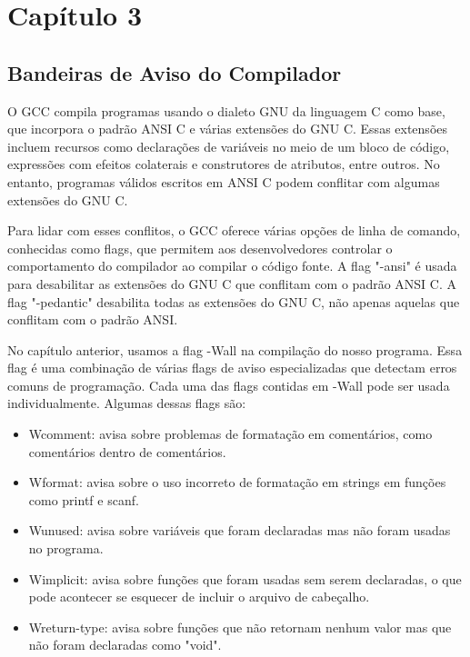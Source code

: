 \chapter{Capítulo 3}

\section{Bandeiras de Aviso do Compilador}

O GCC compila programas usando o dialeto GNU da linguagem C como base, que incorpora o padrão ANSI C e várias extensões do GNU C. Essas extensões incluem recursos como declarações de variáveis no meio de um bloco de código, expressões com efeitos colaterais e construtores de atributos, entre outros. No entanto, programas válidos escritos em ANSI C podem conflitar com algumas extensões do GNU C.

Para lidar com esses conflitos, o GCC oferece várias opções de linha de comando, conhecidas como flags, que permitem aos desenvolvedores controlar o comportamento do compilador ao compilar o código fonte. A flag "-ansi" é usada para desabilitar as extensões do GNU C que conflitam com o padrão ANSI C. A flag "-pedantic" desabilita todas as extensões do GNU C, não apenas aquelas que conflitam com o padrão ANSI.

No capítulo anterior, usamos a flag -Wall na compilação do nosso programa. Essa flag é uma combinação de várias flags de aviso especializadas que detectam erros comuns de programação. Cada uma das flags contidas em -Wall pode ser usada individualmente. Algumas dessas flags são:

\begin{itemize}
    \item Wcomment: avisa sobre problemas de formatação em comentários, como comentários dentro de comentários.

    \item Wformat: avisa sobre o uso incorreto de formatação em strings em funções como printf e scanf.

    \item Wunused: avisa sobre variáveis que foram declaradas mas não foram usadas no programa.

    \item Wimplicit: avisa sobre funções que foram usadas sem serem declaradas, o que pode acontecer se esquecer de incluir o arquivo de cabeçalho.

    \item Wreturn-type: avisa sobre funções que não retornam nenhum valor mas que não foram declaradas como "void".
\end{itemize}

